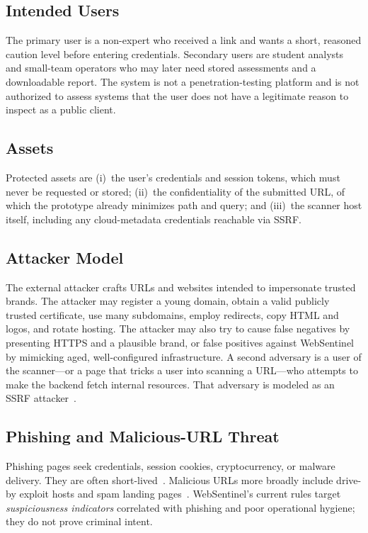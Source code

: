 \documentclass[conference]{IEEEtran}
\begin{document}
\subsection{Intended Users}
The primary user is a non-expert who received a link and wants a short, reasoned caution level before entering credentials. Secondary users are student analysts and small-team operators who may later need stored assessments and a downloadable report. The system is not a penetration-testing platform and is not authorized to assess systems that the user does not have a legitimate reason to inspect as a public client.

\subsection{Assets}
Protected assets are (i)~the user's credentials and session tokens, which must never be requested or stored; (ii)~the confidentiality of the submitted URL, of which the prototype already minimizes path and query; and (iii)~the scanner host itself, including any cloud-metadata credentials reachable via SSRF.

\subsection{Attacker Model}
The external attacker crafts URLs and websites intended to impersonate trusted brands. The attacker may register a young domain, obtain a valid publicly trusted certificate, use many subdomains, employ redirects, copy HTML and logos, and rotate hosting. The attacker may also try to cause false negatives by presenting HTTPS and a plausible brand, or false positives against WebSentinel by mimicking aged, well-configured infrastructure. A second adversary is a user of the scanner---or a page that tricks a user into scanning a URL---who attempts to make the backend fetch internal resources. That adversary is modeled as an SSRF attacker~\cite{owaspssrf}.

\subsection{Phishing and Malicious-URL Threat}
Phishing pages seek credentials, session cookies, cryptocurrency, or malware delivery. They are often short-lived~\cite{hannousse2021benchmark,apwg2024q4}. Malicious URLs more broadly include drive-by exploit hosts and spam landing pages~\cite{ma2009beyond}. WebSentinel's current rules target \emph{suspiciousness indicators} correlated with phishing and poor operational hygiene; they do not prove criminal intent.
\end{document}
